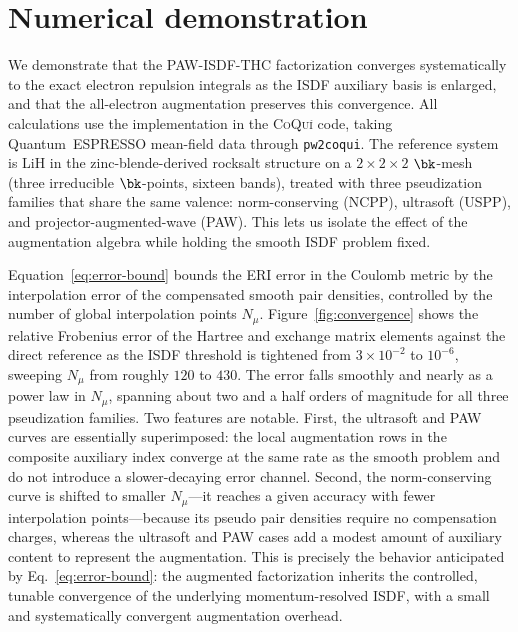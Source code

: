 \section{Numerical demonstration}
\label{sec:numerics}

We demonstrate that the PAW-ISDF-THC factorization converges systematically to
the exact electron repulsion integrals as the ISDF auxiliary basis is enlarged,
and that the all-electron augmentation preserves this convergence.  All
calculations use the implementation in the \textsc{CoQu\'i} code, taking
Quantum~ESPRESSO mean-field data through \texttt{pw2coqui}.  The reference
system is LiH in the zinc-blende-derived rocksalt structure on a
\(2\times2\times2\) \(\bk\)-mesh (three irreducible \(\bk\)-points, sixteen
bands), treated with three pseudization families that share the same valence:
norm-conserving (NCPP), ultrasoft (USPP), and projector-augmented-wave (PAW).
This lets us isolate the effect of the augmentation algebra while holding the
smooth ISDF problem fixed.

Equation~\eqref{eq:error-bound} bounds the ERI error in the Coulomb metric by
the interpolation error of the compensated smooth pair densities, controlled by
the number of global interpolation points \(N_\mu\).  Figure~\ref{fig:convergence}
shows the relative Frobenius error of the Hartree and exchange matrix elements
against the direct reference as the ISDF threshold is tightened from
\(3\times10^{-2}\) to \(10^{-6}\), sweeping \(N_\mu\) from roughly \(120\) to
\(430\).  The error falls smoothly and nearly as a power law in \(N_\mu\),
spanning about two and a half orders of magnitude for all three pseudization
families.  Two features are notable.  First, the ultrasoft and PAW curves are
essentially superimposed: the local augmentation rows in the composite
auxiliary index converge at the same rate as the smooth problem and do not
introduce a slower-decaying error channel.  Second, the norm-conserving curve
is shifted to smaller \(N_\mu\)---it reaches a given accuracy with fewer
interpolation points---because its pseudo pair densities require no compensation
charges, whereas the ultrasoft and PAW cases add a modest amount of auxiliary
content to represent the augmentation.  This is precisely the behavior
anticipated by Eq.~\eqref{eq:error-bound}: the augmented factorization inherits
the controlled, tunable convergence of the underlying momentum-resolved ISDF,
with a small and systematically convergent augmentation overhead.

